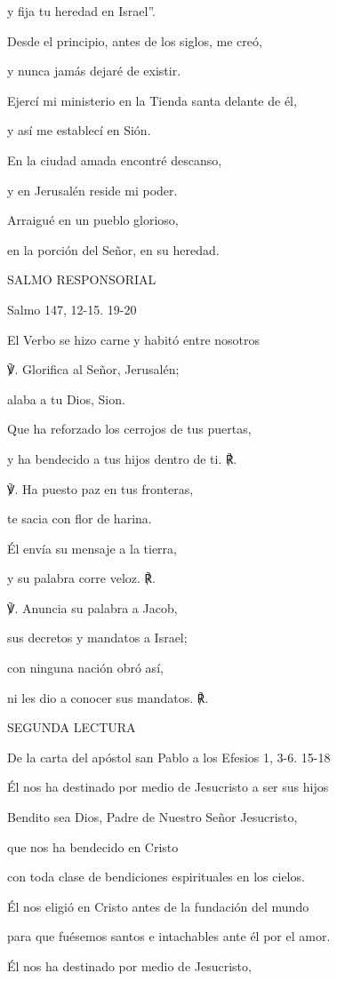 \begin{body}
\begin{body}
y fija tu heredad en Israel''.

Desde el principio, antes de los siglos, me creó,

y nunca jamás dejaré de existir.

Ejercí mi ministerio en la Tienda santa delante de él,

y así me establecí en Sión.

En la ciudad amada encontré descanso,

y en Jerusalén reside mi poder.

Arraigué en un pueblo glorioso,

en la porción del Señor, en su heredad.

SALMO RESPONSORIAL

Salmo 147, 12-15. 19-20

El Verbo se hizo carne y habitó entre nosotros

℣. Glorifica al Señor, Jerusalén;

alaba a tu Dios, Sion.

Que ha reforzado los cerrojos de tus puertas,

y ha bendecido a tus hijos dentro de ti. ℟.

℣. Ha puesto paz en tus fronteras,

te sacia con flor de harina.

Él envía su mensaje a la tierra,

y su palabra corre veloz. ℟.

℣. Anuncia su palabra a Jacob,

sus decretos y mandatos a Israel;

con ninguna nación obró así,

ni les dio a conocer sus mandatos. ℟.

SEGUNDA LECTURA

De la carta del apóstol san Pablo a los Efesios 1, 3-6. 15-18

Él nos ha destinado por medio de Jesucristo a ser sus hijos

Bendito sea Dios, Padre de Nuestro Señor Jesucristo,

que nos ha bendecido en Cristo

con toda clase de bendiciones espirituales en los cielos.

Él nos eligió en Cristo antes de la fundación del mundo

para que fuésemos santos e intachables ante él por el amor.

Él nos ha destinado por medio de Jesucristo,


\end{body}
\end{body}

